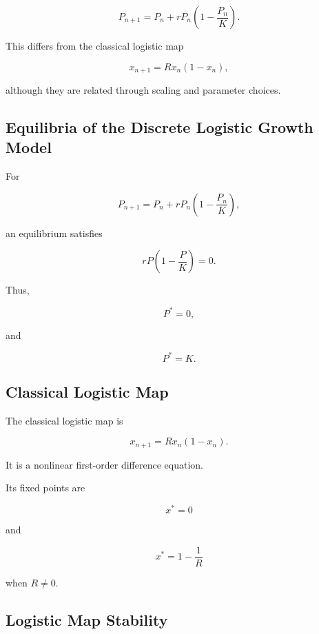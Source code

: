 \[
\boxed{
P_{n+1}
=
P_n
+
rP_n
\left(
1-\frac{P_n}{K}
\right).
}
\]

This differs from the classical logistic map

\[
x_{n+1}
=
Rx_n(1-x_n),
\]

although they are related through scaling and parameter choices.

\subsection{Equilibria of the Discrete Logistic Growth Model}
\label{subsec:discrete-logistic-growth-equilibria}

For

\[
P_{n+1}
=
P_n
+
rP_n
\left(
1-\frac{P_n}{K}
\right),
\]

an equilibrium satisfies

\[
rP
\left(
1-\frac{P}{K}
\right)=0.
\]

Thus,

\[
\boxed{
P^*=0,
}
\]

and

\[
\boxed{
P^*=K.
}
\]

\subsection{Classical Logistic Map}
\label{subsec:difference-logistic-map}

The classical logistic map is

\[
\boxed{
x_{n+1}
=
Rx_n(1-x_n).
}
\]

It is a nonlinear first-order difference equation.

Its fixed points are

\[
\boxed{
x^*=0
}
\]

and

\[
\boxed{
x^*
=
1-\frac1R
}
\]

when \(R\neq0\).

\subsection{Logistic Map Stability}
\label{subsec:difference-logistic-map-stability}

